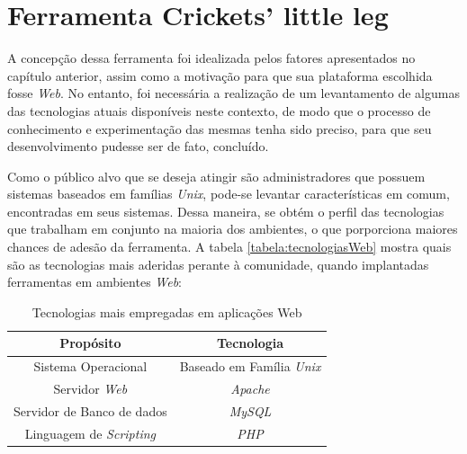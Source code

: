 \chapter{Ferramenta Crickets' little leg}\label{2_ferramenta_cll}

A concepção dessa ferramenta foi idealizada pelos fatores apresentados no capítulo anterior, assim como a motivação para que sua plataforma escolhida fosse \textit{Web}. No entanto, foi necessária a realização de um levantamento de algumas das tecnologias atuais disponíveis neste contexto, de modo que o processo de conhecimento e experimentação das mesmas tenha sido preciso, para que seu desenvolvimento pudesse ser de fato, concluído.

Como o público alvo que se deseja atingir são administradores que possuem sistemas baseados em famílias \textit{Unix}, pode-se levantar características em comum, encontradas em seus sistemas. Dessa maneira, se obtém o perfil das tecnologias que trabalham em conjunto na maioria dos ambientes, o que porporciona maiores chances de adesão da ferramenta. A tabela \ref{tabela:tecnologiasWeb} mostra quais são as tecnologias mais aderidas perante à comunidade, quando implantadas ferramentas em ambientes \textit{Web}:

\begin{table}[ht]
    \centering
    \caption{\label{tabela:tecnologiasWeb}Tecnologias mais empregadas em aplicações Web}

    \begin{tabular}{c c}
        \hline
        \hline

        Propósito & Tecnologia\\ [0.5ex]
        \hline

        Sistema Operacional & Baseado em Família \textit{Unix}\\

        Servidor \textit{Web} & \textit{Apache}\footnotemark[1]\\

        Servidor de Banco de dados & \textit{MySQL}\footnotemark[2]\\

        Linguagem de \textit{Scripting} & \textit{PHP}\footnotemark[3]\\ [0.1ex]
        \hline
    \end{tabular}
    \label{webapptech}
\end{table}


